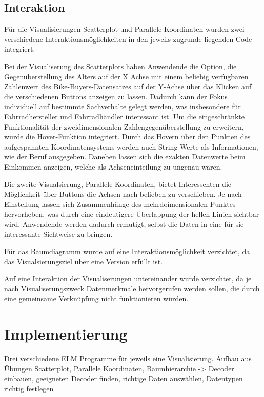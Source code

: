 \documentclass[usegeometry=true]{scrartcl}
\begin{document}
\subsection{Interaktion}
Für die Visualisierungen Scatterplot und Parallele Koordinaten wurden zwei verschiedene Interaktionsmöglichkeiten in den jeweils zugrunde liegenden Code integriert. 

Bei der Visualiserung des Scatterplots haben Anwendende die Option, die Gegenüberstellung des Alters auf der X Achse mit einem beliebig verfügbaren Zahlenwert des Bike-Buyers-Datensatzes auf der Y-Achse  über das Klicken auf die verschiedenen Buttons anzeigen zu lassen. Dadurch kann der Fokus individuell auf bestimmte Sachverhalte gelegt werden, was insbesondere für Fahrradhersteller und Fahrradhändler interessant ist. Um die eingeschränkte Funktionalität der zweidimensionalen Zahlengegenüberstellung zu erweitern, wurde die Hover-Funktion integriert. Durch das Hovern über den Punkten des aufgespannten Koordinatensystems werden auch String-Werte als Informationen, wie der Beruf ausgegeben. Daneben lassen sich die exakten Datenwerte beim Einkommen anzeigen, welche als Achseneinteilung zu ungenau wären. 

Die zweite Visualsierung, Parallele Koordinaten, bietet Interessenten die Möglichkeit über Buttons die Achsen nach belieben zu verschieben. Je nach Einstellung lassen sich Zusammenhänge des mehrdoímensionalen Punktes hervorheben, was durch eine eindeutigere Überlappung der hellen Linien sichtbar wird. Anwendende werden dadurch ermutigt, selbst die Daten in eine für sie interessante Sichtweise zu bringen. 

Für das Baumdiagramm wurde auf eine Interaktionsmöglichkeit verzichtet, da das Visualsierungsziel über eine Version erfüllt ist. 

Auf eine Interaktion der Visualiserungen untereinander wurde verzichtet, da je nach Visualiserungszweck Datenmerkmale hervorgerufen werden sollen, die durch eine gemeinsame Verknüpfung nicht funktionieren würden. 

\section{Implementierung}

Drei verschiedene ELM Programme für jeweils eine Visualisierung. Aufbau aus Übungen Scatterplot, Parallele Koordinaten, Baumhierarchie -> Decoder einbauen, geeigneten Decoder finden, richtige Daten auswählen, Datentypen richtig festlegen 
\end{document}
